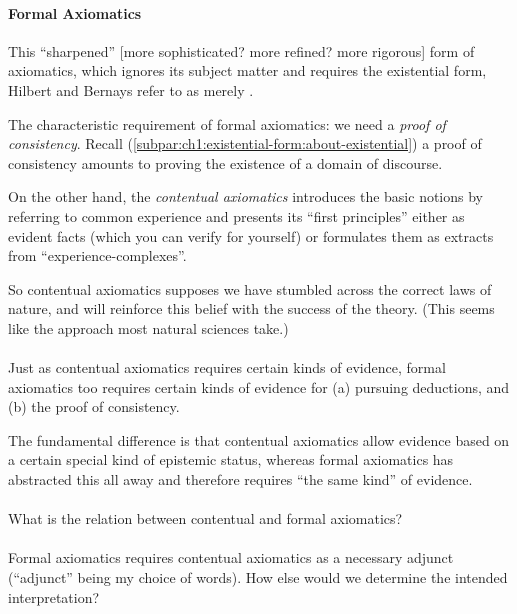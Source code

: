 \paragraph{Formal Axiomatics}
This ``sharpened'' [more sophisticated? more refined? more rigorous]
form of axiomatics, which ignores its subject matter and requires the
existential form, Hilbert and Bernays refer to as merely
.

The characteristic requirement of formal axiomatics: we need a
\emph{proof of consistency}. Recall (\pilcrow\ref{subpar:ch1:existential-form:about-existential})
a proof of consistency amounts to proving the existence of a domain of
discourse.

On the other hand, the \emph{contentual axiomatics} introduces the basic
notions by referring to common experience and presents its ``first principles''
either as evident facts (which you can verify for yourself) or
formulates them as extracts from ``experience-complexes''.

So contentual axiomatics supposes we have stumbled across the correct
laws of nature, and will reinforce this belief with the success of the
theory. (This seems like the approach most natural sciences take.)

\paragraph{}
Just as contentual axiomatics requires certain kinds of evidence,
formal axiomatics too requires certain kinds of evidence for (a)
pursuing deductions, and (b) the proof of consistency.

The fundamental difference is that contentual axiomatics allow
evidence based on a certain special kind of epistemic status, whereas
formal axiomatics has abstracted this all away and therefore requires
``the same kind'' of evidence.

\paragraph{}
What is the relation between contentual and formal axiomatics?

\paragraph{}
Formal axiomatics requires contentual axiomatics as a necessary
adjunct (``adjunct'' being my choice of words). How else would we
determine the intended interpretation?

